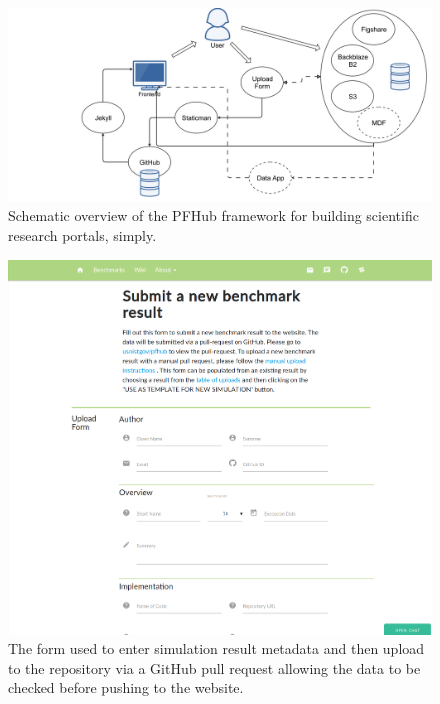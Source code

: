 \documentclass{jors}
\begin{document}
\begin{figure}
  \includegraphics[width=\textwidth]{pfhub_website.png}
  \caption{Schematic overview of the PFHub framework for building
    scientific research portals, simply.}
  \centering
  \label{fig:pfhub_website}
\end{figure}

\begin{figure}
  \includegraphics[width=\textwidth]{pfhub_upload.png}
  \caption{The form used to enter simulation result metadata and then
    upload to the repository via a GitHub pull request allowing the
    data to be checked before pushing to the website.}  \centering
  \label{fig:pfhub_upload}
\end{figure}
\end{document}
